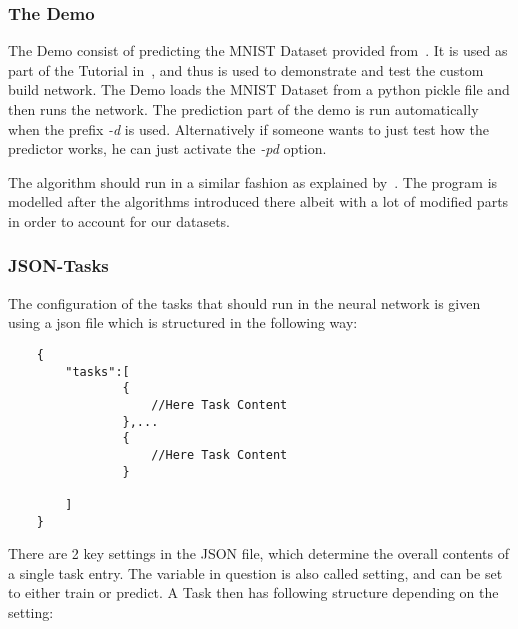 \documentclass{article}
\begin{document}

\subsubsection{The Demo}
\label{subsub:demo}
The Demo consist of predicting the MNIST Dataset provided from~\cite{MNISTSite}. It is used as part of the Tutorial in~\cite{deepLearning.org}, and thus is used to demonstrate and test the custom build network. The Demo loads the MNIST Dataset from a python pickle file and then runs the network. The prediction part of the demo is run automatically when the prefix \emph{-d} is used. Alternatively if someone wants to just test how the predictor works, he can just activate the \emph{-pd} option.

The algorithm should run in a similar fashion as explained by~\cite{theanoTutorial}. The program is modelled after the algorithms introduced there albeit with a lot of modified parts in order to account for our datasets.

\subsubsection{JSON-Tasks}
\label{subsub:json}

The configuration of the tasks that should run in the neural network is given using a json file which is structured in the following way:
\begin{verbatim}
    {
        "tasks":[
                {
                    //Here Task Content    
                },...
                {
                    //Here Task Content 
                }
        
        ]
    }
\end{verbatim}

There are 2 key settings in the JSON file, which determine the overall contents of a single task entry. The variable in question is also called setting, and can be set to either train or predict. A Task then has following structure depending on the setting:
\end{document}
